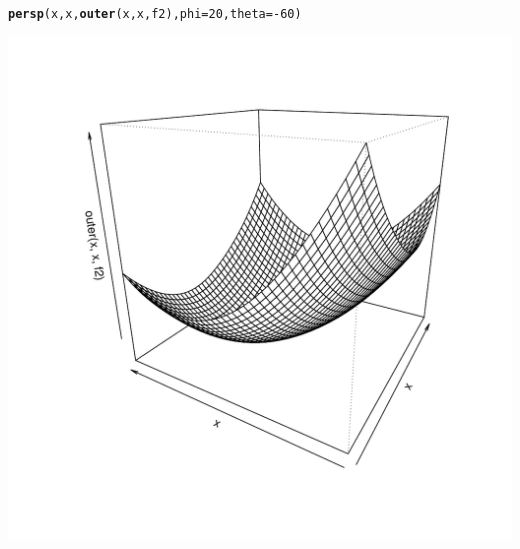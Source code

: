 \documentclass[11pt]{article}\usepackage[]{graphicx}\usepackage[]{color}
\makeatletter
\def\maxwidth{ %
  \ifdim\Gin@nat@width>\linewidth
    \linewidth
  \else
    \Gin@nat@width
  \fi
}
\newcommand{\hlnum}[1]{\textcolor[rgb]{0.686,0.059,0.569}{#1}}%
\newcommand{\hlopt}[1]{\textcolor[rgb]{0,0,0}{#1}}%
\newcommand{\hlstd}[1]{\textcolor[rgb]{0.345,0.345,0.345}{#1}}%
\newcommand{\hlkwc}[1]{\textcolor[rgb]{0.333,0.667,0.333}{#1}}%
\newcommand{\hlkwd}[1]{\textcolor[rgb]{0.737,0.353,0.396}{\textbf{#1}}}%
\newenvironment{kframe}{%
 \def\at@end@of@kframe{}%
 \ifinner\ifhmode%
  \def\at@end@of@kframe{\end{minipage}}%
  \begin{minipage}{\columnwidth}%
 \fi\fi%
 \def\FrameCommand##1{\hskip\@totalleftmargin \hskip-\fboxsep
 \colorbox{shadecolor}{##1}\hskip-\fboxsep
     \hskip-\linewidth \hskip-\@totalleftmargin \hskip\columnwidth}%
 \MakeFramed {\advance\hsize-\width
   \@totalleftmargin\z@ \linewidth\hsize
   \@setminipage}}%
 {\par\unskip\endMakeFramed%
 \at@end@of@kframe}
\newenvironment{knitrout}{}{} %
\makeatother
\begin{document}
\begin{knitrout}
\color{fgcolor}\begin{kframe}
\begin{alltt}
\hlkwd{persp}\hlstd{(x,x,}\hlkwd{outer}\hlstd{(x,x,f2),}\hlkwc{phi}\hlstd{=}\hlnum{20}\hlstd{,}\hlkwc{theta}\hlstd{=}\hlopt{-}\hlnum{60}\hlstd{)}
\end{alltt}
\end{kframe}
\includegraphics[width=\maxwidth]{figure/unnamed-chunk-17-1} 

\end{knitrout}
\end{document}
